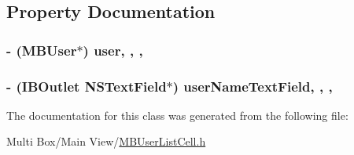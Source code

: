 \subsection{Property Documentation}
\hypertarget{interface_m_b_user_list_cell_ae8dc212338dc50b6c516604ef10ae664}{
\subsubsection[{user}]{\setlength{\rightskip}{0pt plus 5cm}-\/ ({\bf M\-B\-User}$\ast$) user\hspace{0.3cm}{\ttfamily [read]}, {\ttfamily [write]}, {\ttfamily [nonatomic]}, {\ttfamily [strong]}}}\label{interface_m_b_user_list_cell_ae8dc212338dc50b6c516604ef10ae664}
\hypertarget{interface_m_b_user_list_cell_a978cf8e81d871e3de60e37109cce26e5}{
\subsubsection[{user\-Name\-Text\-Field}]{\setlength{\rightskip}{0pt plus 5cm}-\/ (I\-B\-Outlet N\-S\-Text\-Field$\ast$) user\-Name\-Text\-Field\hspace{0.3cm}{\ttfamily [read]}, {\ttfamily [write]}, {\ttfamily [nonatomic]}, {\ttfamily [strong]}}}\label{interface_m_b_user_list_cell_a978cf8e81d871e3de60e37109cce26e5}


The documentation for this class was generated from the following file\-:\begin{DoxyCompactItemize}
\item 
Multi Box/\-Main View/\hyperlink{_m_b_user_list_cell_8h}{M\-B\-User\-List\-Cell.\-h}\end{DoxyCompactItemize}
